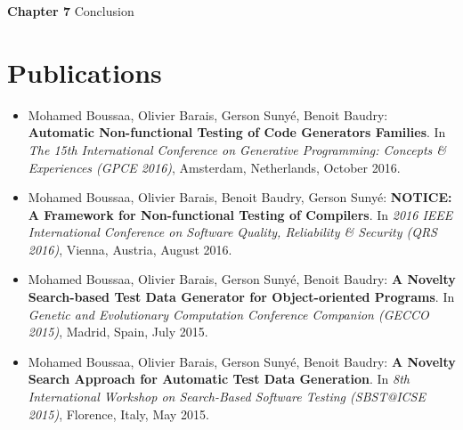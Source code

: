 \textbf{Chapter 7} Conclusion
\section{Publications}

\begin{itemize}
	
	\item Mohamed Boussaa, Olivier Barais, Gerson Sunyé, Benoit Baudry:
	\textbf{Automatic Non-functional Testing of Code Generators Families}. In
	\textit{The 15th International Conference on Generative Programming: Concepts \& Experiences (GPCE 2016)},
	Amsterdam, Netherlands, October 2016.

	\item Mohamed Boussaa, Olivier Barais, Benoit Baudry, Gerson Sunyé:
	\textbf{NOTICE: A Framework for Non-functional Testing of Compilers}. In 
	\textit{2016 IEEE International Conference on Software Quality, Reliability \& Security (QRS 2016)}, Vienna, Austria, August 2016.
	
	\item Mohamed Boussaa, Olivier Barais, Gerson Sunyé, Benoit Baudry:
	\textbf{A Novelty Search-based Test Data Generator for Object-oriented Programs}. In 
	\textit{Genetic and Evolutionary Computation Conference Companion (GECCO 2015)}, 
	Madrid, Spain, July 2015.
	
	\item Mohamed Boussaa, Olivier Barais, Gerson Sunyé, Benoit Baudry:
	\textbf{A Novelty Search Approach for Automatic Test Data Generation}. In
	\textit{8th International Workshop on Search-Based Software Testing (SBST@ICSE 2015)}, 
	Florence, Italy, May 2015.

	
	
\end{itemize}


